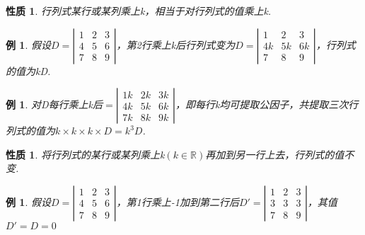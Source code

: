 \documentclass[12pt, a4paper, oneside]{ctexbook}
\newtheorem{example}[theorem]{例}
\newtheorem{quolity}[theorem]{性质}
\begin{document}
\begin{quolity}
    行列式某行或某列乘上k，相当于对行列式的值乘上k. 
\end{quolity}

\begin{example}
    假设$D=\left | \begin{matrix}
        1 & 2 & 3 \\
        4 & 5 & 6 \\
        7 & 8 & 9
    \end{matrix} \right |$，第2行乘上k后行列式变为$D=\left | \begin{matrix}
        1  & 2  & 3 \\
        4k & 5k & 6k \\
        7  & 8  & 9
    \end{matrix} \right |$，行列式的值为kD. 
\end{example}

\begin{example}
    对D每行乘上k后$=\left | \begin{matrix}
        1k & 2k & 3k \\
        4k & 5k & 6k \\
        7k & 8k & 9k
    \end{matrix} \right |$，即每行k均可提取公因子，共提取三次行列式的值为$k \times k \times k \times D = k^3D$. 
\end{example}

\begin{quolity}
    将行列式的某行或某列乘上k$(k \in \mathbb{R})$再加到另一行上去，行列式的值不变. 
\end{quolity}

\begin{example}
    假设$D=\left | \begin{matrix}
        1 & 2 & 3 \\
        4 & 5 & 6 \\
        7 & 8 & 9
    \end{matrix} \right |$，第1行乘上-1加到第二行后$D'=\left | \begin{matrix}
        1 & 2 & 3 \\
        3 & 3 & 3 \\
        7 & 8 & 9
    \end{matrix} \right |$，其值$D'=D=0$
\end{example}
\end{document}
